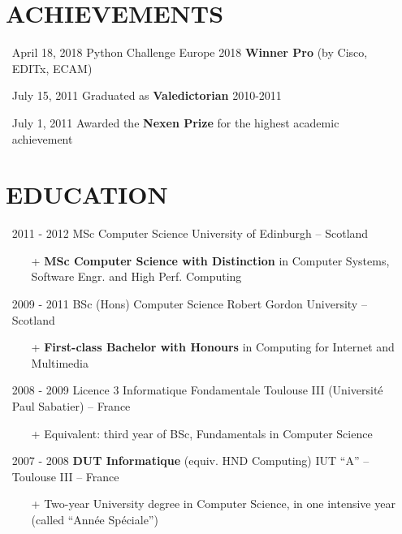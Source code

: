 \documentclass{res}
\begin{document}
\begin{resume}
\section{\faMedal~ACHIEVEMENTS}
\begin{itemize}
        \item[] April 18, 2018 \tabto{4cm} Python Challenge Europe 2018 \textbf{Winner Pro} (by Cisco, EDITx, ECAM)
        \item[] July 15, 2011 \tabto{4cm} Graduated as \textbf{Valedictorian} 2010-2011
        \item[] July 1, 2011 \tabto{4cm} Awarded the \textbf{Nexen Prize} for the highest academic achievement
\end{itemize}

\section{\faGraduationCap~EDUCATION}
\begin{itemize} 
\item[] 2011 - 2012 \tabto{2cm} MSc Computer Science \hfill University of Edinburgh -- Scotland 
        \begin{itemize}
                \item[+] \textbf{MSc Computer Science with Distinction} in Computer Systems, Software Engr. and High Perf. Computing
        \end{itemize}
        
\item[] 2009 - 2011 \tabto{2cm} BSc (Hons) Computer Science \hfill Robert Gordon University -- Scotland 
        \begin{itemize}
                \item[+] \textbf{First-class Bachelor with Honours} in Computing for Internet and Multimedia
        \end{itemize}
        
\item[] 2008 - 2009 \tabto{2cm} Licence 3 Informatique Fondamentale \hfill Toulouse III (Universit\'e Paul Sabatier) -- France
        \begin{itemize}
                \item[+] Equivalent: third year of BSc, Fundamentals in Computer Science
        \end{itemize}

\item[] 2007 - 2008 \tabto{2cm} \textbf{DUT Informatique} (equiv. HND Computing) \hfill IUT ``A'' -- Toulouse III -- France
        \begin{itemize}
                \item[+] Two-year University degree in Computer Science, in one intensive year (called ``Ann\'ee Sp\'eciale'')
        \end{itemize}


\end{itemize}
\end{resume}
\end{document}
